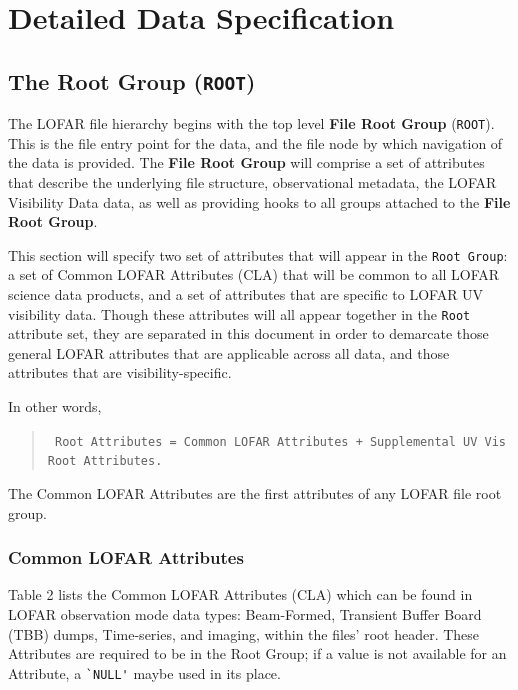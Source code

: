 \documentclass[a4paper,10pt,bibtotoc]{scrartcl}
\begin{document}

\section{Detailed Data Specification}
\label{sec:detailed structure}



\subsection{The Root Group ({\tt ROOT})}
\label{sec:root group}

The LOFAR file hierarchy begins with the top level \textbf{File Root
  Group} (\verb|ROOT|). This is the file entry point for the data, and
the file node by which navigation of the data is provided.  The
\textbf{File Root Group} will comprise a set of attributes that describe
the underlying file structure, observational metadata, the LOFAR Visibility Data
data, as well as providing hooks to all groups attached to the
\textbf{File Root Group}.

This section will specify two set of attributes that will appear in
the \texttt{Root Group}: a set of Common LOFAR Attributes (CLA) that
will be common to all LOFAR science data products, and a set of
attributes that are specific to LOFAR UV visibility data. Though
these attributes will all appear together in the \texttt{Root}
attribute set, they are separated in this document in order to
demarcate those general LOFAR attributes that are applicable across
all data, and those attributes that are visibility-specific.

In other words,
\begin{verse}
  \verb| Root Attributes = Common LOFAR Attributes + Supplemental UV Vis Root Attributes.|
\end{verse}

The Common LOFAR Attributes are the first attributes of any LOFAR file root group.

\subsubsection{Common LOFAR Attributes}
\label{sec:LOFARCommonMetadata}

Table 2 lists the Common LOFAR Attributes (CLA) which can be found in
LOFAR observation mode data types: Beam-Formed, Transient Buffer Board
(TBB) dumps, Time-series, and imaging, within the files' root
header. These Attributes are required to be in the Root Group; if a
value is not available for an Attribute, a \verb|`NULL'| maybe used in
its place.
\end{document}
